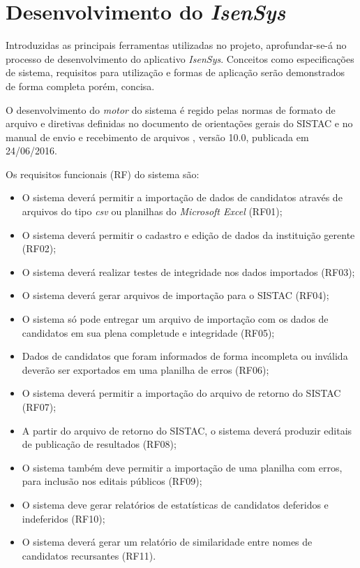 \documentclass[
	12pt,			%
	openright,		%
	oneside,	
	a4paper,		%
	english,		%
	brazil			%
]{abntex2/abntex2}  %
\begin{document}
\chapter{Desenvolvimento do \textit{IsenSys}}

	Introduzidas as principais ferramentas utilizadas no projeto, aprofundar-se-á no processo de desenvolvimento do aplicativo \textit{IsenSys}. Conceitos como especificações de sistema, requisitos para utilização e formas de aplicação serão demonstrados de forma completa porém, concisa.
	
	O desenvolvimento do \textit{motor} do sistema é regido pelas normas de formato de arquivo e diretivas definidas no documento de orientações gerais do SISTAC \cite{sistac-gerais} e no manual de envio e recebimento de arquivos \cite{sistac-formatos}, versão 10.0, publicada em 24/06/2016.
	
	Os requisitos funcionais (RF) do sistema são:
	
	\begin{itemize}

		\item O sistema deverá permitir a importação de dados de candidatos através de arquivos do tipo \textit{csv} ou planilhas do \textit{Microsoft Excel} (RF01);
		\item O sistema deverá permitir o cadastro e edição de dados da instituição gerente (RF02);
		\item O sistema deverá realizar testes de integridade nos dados importados (RF03);
		\item O sistema deverá gerar arquivos de importação para o SISTAC (RF04);
		\item O sistema só pode entregar um arquivo de importação com os dados de candidatos em sua plena completude e integridade (RF05);
		\item Dados de candidatos que foram informados de forma incompleta ou inválida deverão ser exportados em uma planilha de erros (RF06);
		\item O sistema deverá permitir a importação do arquivo de retorno do SISTAC (RF07);
		\item A partir do arquivo de retorno do SISTAC, o sistema deverá produzir editais de publicação de resultados (RF08);
		\item O sistema também deve permitir a importação de uma planilha com erros, para inclusão nos editais públicos (RF09);
		\item O sistema deve gerar relatórios de estatísticas de candidatos deferidos e indeferidos (RF10);
		\item O sistema deverá gerar um relatório de similaridade entre nomes de candidatos recursantes (RF11).
		
	\end{itemize}
	
\end{document}
